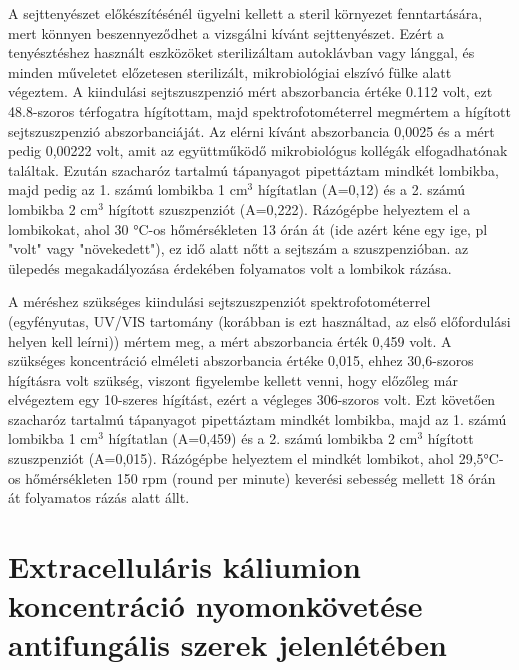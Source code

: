 A sejttenyészet előkészítésénél ügyelni kellett a steril környezet fenntartására, mert könnyen beszennyeződhet a vizsgálni kívánt sejttenyészet. Ezért a tenyésztéshez használt eszközöket sterilizáltam autoklávban vagy lánggal, és minden műveletet előzetesen sterilizált, mikrobiológiai elszívó fülke alatt végeztem. A kiindulási sejtszuszpenzió mért abszorbancia értéke 0.112 volt, ezt 48.8-szoros térfogatra hígítottam, majd spektrofotométerrel megmértem a hígított sejtszuszpenzió abszorbanciáját. Az elérni kívánt abszorbancia 0,0025 és a mért pedig 0,00222 volt, amit az együttműködő mikrobiológus kollégák elfogadhatónak találtak. Ezután szacharóz tartalmú tápanyagot pipettáztam mindkét lombikba, majd pedig az 1. számú lombikba 1 cm$^3$ hígítatlan (A=0,12) és a 2. számú lombikba 2 cm$^3$ hígított szuszpenziót (A=0,222). Rázógépbe helyeztem el a lombikokat, ahol 30 °C-os hőmérsékleten 13 órán át (ide azért kéne egy ige, pl "volt" vagy "növekedett"), ez idő alatt nőtt a sejtszám a szuszpenzióban. az ülepedés megakadályozása érdekében folyamatos volt a lombikok rázása. 

A méréshez szükséges kiindulási sejtszuszpenziót spektrofotométerrel (egyfényutas, UV/VIS tartomány (korábban is ezt használtad, az első előfordulási helyen kell leírni)) mértem meg, a mért abszorbancia érték 0,459 volt. A szükséges koncentráció elméleti abszorbancia értéke 0,015, ehhez 30,6-szoros hígításra volt szükség, viszont figyelembe kellett venni, hogy előzőleg már elvégeztem egy 10-szeres hígítást, ezért a végleges 306-szoros volt. Ezt követően szacharóz tartalmú tápanyagot pipettáztam mindkét lombikba, majd az 1. számú lombikba 1 cm$^3$ hígítatlan (A=0,459) és a 2. számú lombikba 2 cm$^3$ hígított szuszpenziót (A=0,015).  Rázógépbe helyeztem el mindkét lombikot, ahol 29,5°C-os hőmérsékleten 150 rpm (round per minute) keverési sebesség mellett 18 órán át folyamatos rázás alatt állt.

\section{Extracelluláris káliumion koncentráció nyomonkövetése antifungális szerek jelenlétében}

